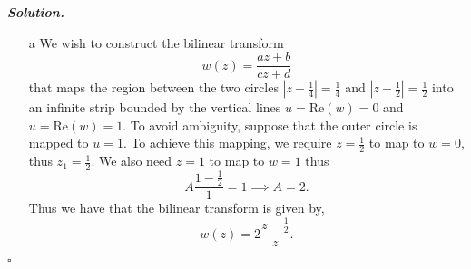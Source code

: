 \documentclass[12pt]{report}
\newenvironment{solution}[1][\it{Solution}]{\textbf{#1. } }{$\square$}
\begin{document}
\begin{solution}
    \noindent
    \begin{enumerate}
        \item[a]
        We wish to construct the bilinear transform
        \[ w(z) = \frac{az + b}{cz + d}\]
        that maps the region between the two circles $| z - \frac{1}{4} | = \frac{1}{4}$ and $| z - \frac{1}{2} | = \frac{1}{2}$ into an infinite strip bounded by the vertical lines $u = \mathrm{Re}(w) = 0$ and $u = \mathrm{Re}(w) = 1$. To avoid ambiguity, suppose that the outer circle is mapped to $u = 1$. To achieve this mapping, we require $z = \frac{1}{2}$ to map to $w = 0$, thus $z_1 = \frac{1}{2}$. We also need $z = 1$ to map to $w = 1$ thus
        \[ A \frac{1 - \frac{1}{2}}{1} = 1 \implies A = 2.\]
        Thus we have that the bilinear transform is given by,
        \[ w(z) = 2 \frac{z - \frac{1}{2}}{z}.\]


\end{enumerate}
\end{solution}
\end{document}
